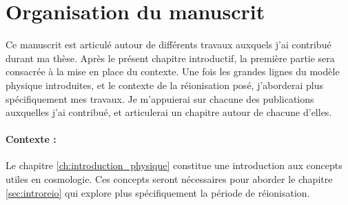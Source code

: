 %


\section{Organisation du manuscrit}

Ce manuscrit est articulé autour de différents travaux auxquels j'ai contribué durant ma thèse.
Après le présent chapitre introductif, la première partie sera consacrée à la mise en place du contexte.
Une fois les grandes lignes du modèle physique introduites, et le contexte de la réionisation posé, j'aborderai plus spécifiquement mes travaux.
Je m'appuierai sur chacune des publications auxquelles j'ai contribué, et articulerai un chapitre autour de chacune d'elles. 

\paragraph{Contexte :}
Le chapitre \ref{ch:introduction_physique} constitue une introduction aux concepts utiles en cosmologie.
Ces concepts seront nécessaires pour aborder le chapitre \ref{sec:introreio} qui explore plus spécifiquement la période de réionisation.


